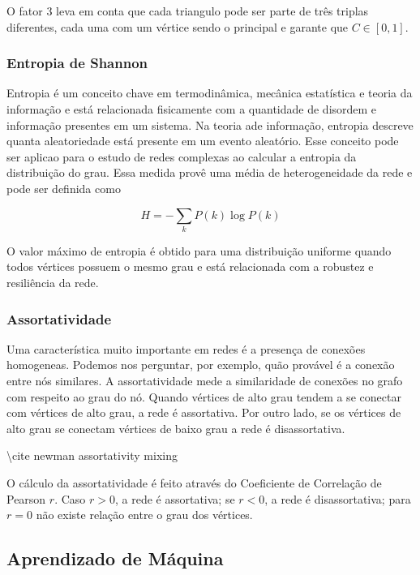O fator 3 leva em conta que cada triangulo pode ser parte de três
triplas diferentes, cada uma com um vértice sendo o principal e garante
que \(C \in [0, 1]\).

\subsubsection{Entropia de Shannon}\label{entropia-de-shannon}

Entropia é um conceito chave em termodinâmica, mecânica estatística e
teoria da informação e está relacionada fisicamente com a quantidade de
disordem e informação presentes em um sistema. Na teoria ade informação,
entropia descreve quanta aleatoriedade está presente em um evento
aleatório. Esse conceito pode ser aplicao para o estudo de redes
complexas ao calcular a entropia da distribuição do grau. Essa medida
provê uma média de heterogeneidade da rede e pode ser definida como

\[
H = - \sum_k P(k) \log P(k)
\]

O valor máximo de entropia é obtido para uma distribuição uniforme
quando todos vértices possuem o mesmo grau e está relacionada com a
robustez e resiliência da rede.

\subsubsection{Assortatividade}\label{assortatividade}

Uma característica muito importante em redes é a presença de conexões
homogeneas. Podemos nos perguntar, por exemplo, quão provável é a
conexão entre nós similares. A assortatividade mede a similaridade de
conexões no grafo com respeito ao grau do nó. Quando vértices de alto
grau tendem a se conectar com vértices de alto grau, a rede é
assortativa. Por outro lado, se os vértices de alto grau se conectam
vértices de baixo grau a rede é disassortativa.

\textbackslash cite newman assortativity mixing

O cálculo da assortatividade é feito através do Coeficiente de
Correlação de Pearson \(r\). Caso \(r>0\), a rede é assortativa; se
\(r<0\), a rede é disassortativa; para \(r=0\) não existe relação entre
o grau dos vértices.

\subsection{Aprendizado de Máquina}\label{aprendizado-de-muxe1quina}

